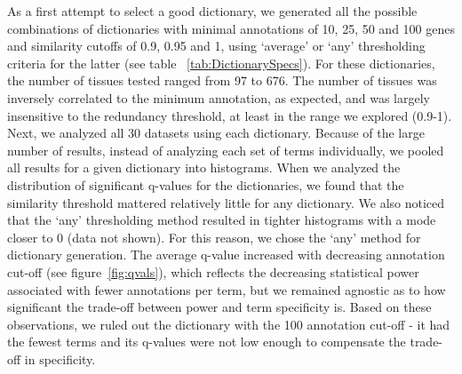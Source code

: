 \documentclass[linenumbers, doublespacing]{bmcart}
\begin{document}
	As a first attempt to select a good dictionary, we generated all the possible combinations of dictionaries with minimal annotations of 10, 25, 50 and 100 genes and similarity cutoffs of 0.9, 0.95 and 1, using ‘average’ or ‘any’ thresholding criteria for the latter (see table ~\ref{tab:DictionarySpecs}). For these dictionaries, the number of tissues tested ranged from 97 to 676. The number of tissues was inversely correlated to the minimum annotation, as expected, and was largely insensitive to the redundancy threshold, at least in the range we explored (0.9-1). Next, we analyzed all 30 datasets using each dictionary. Because of the large number of results, instead of analyzing each set of terms individually, we pooled all results for a given dictionary into histograms. When we analyzed the distribution of significant q-values for the dictionaries, we found that the similarity threshold mattered relatively little for any dictionary. We also noticed that the `any' thresholding method resulted in tighter histograms with a mode closer to 0 (data not shown). For this reason, we chose the ‘any’ method for dictionary generation. The average q-value increased with decreasing annotation cut-off (see figure~\ref{fig:qvals}), which reflects the decreasing statistical power associated with fewer annotations per term, but we remained agnostic as to how significant the trade-off between power and term specificity is. Based on these observations, we ruled out the dictionary with the 100 annotation cut-off - it had the fewest terms and its q-values were not low enough to compensate the trade-off in specificity.
	
\end{document}
